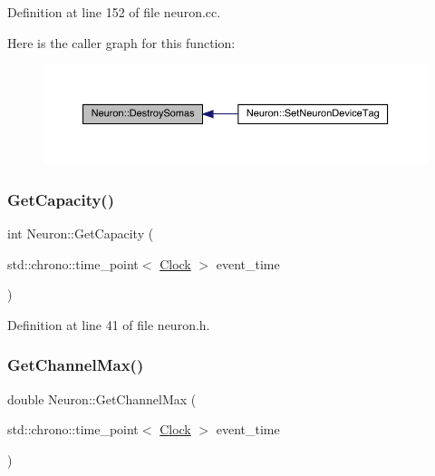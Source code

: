 Definition at line 152 of file neuron.\+cc.

Here is the caller graph for this function\+:
\nopagebreak
\begin{figure}[H]
\begin{center}
\leavevmode
\includegraphics[width=350pt]{class_neuron_a32b3a98eec58dc66481a2b877a7592cb_icgraph}
\end{center}
\end{figure}
\mbox{\label{class_neuron_a93cce70c19c8e70accaa31908d3f29f6}} 
\subsubsection{\texorpdfstring{Get\+Capacity()}{GetCapacity()}}
{\footnotesize\ttfamily int Neuron\+::\+Get\+Capacity (\begin{DoxyParamCaption}\item[{std\+::chrono\+::time\+\_\+point$<$ \hyperlink{universe_8h_a0ef8d951d1ca5ab3cfaf7ab4c7a6fd80}{Clock} $>$}]{event\+\_\+time }\end{DoxyParamCaption})\hspace{0.3cm}{\ttfamily [inline]}}



Definition at line 41 of file neuron.\+h.

\mbox{\label{class_neuron_ae8b6c47bebe302e62721dc4a6e447ca2}} 
\subsubsection{\texorpdfstring{Get\+Channel\+Max()}{GetChannelMax()}}
{\footnotesize\ttfamily double Neuron\+::\+Get\+Channel\+Max (\begin{DoxyParamCaption}\item[{std\+::chrono\+::time\+\_\+point$<$ \hyperlink{universe_8h_a0ef8d951d1ca5ab3cfaf7ab4c7a6fd80}{Clock} $>$}]{event\+\_\+time }\end{DoxyParamCaption})\hspace{0.3cm}{\ttfamily [inline]}}



